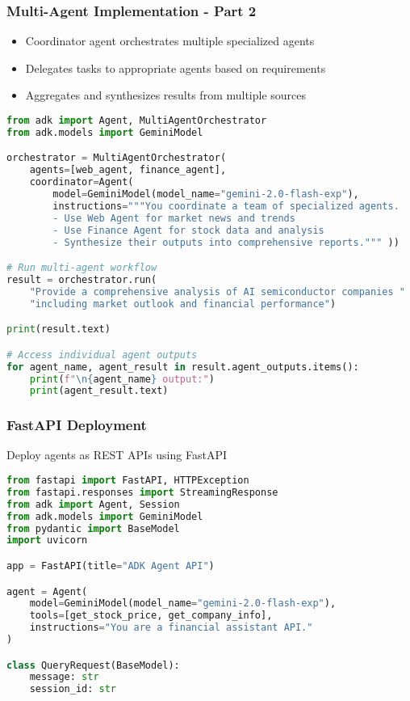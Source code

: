 \begin{frame}[fragile]\frametitle{Multi-Agent Implementation - Part 2}
      \begin{itemize}
	\item Coordinator agent orchestrates multiple specialized agents
	\item Delegates tasks to appropriate agents based on requirements
	\item Aggregates and synthesizes results from multiple sources
	  \end{itemize}
      
      \begin{lstlisting}[language=python, basicstyle=\tiny]
from adk import Agent, MultiAgentOrchestrator
from adk.models import GeminiModel

orchestrator = MultiAgentOrchestrator(
    agents=[web_agent, finance_agent],
    coordinator=Agent(
        model=GeminiModel(model_name="gemini-2.0-flash-exp"),
        instructions="""You coordinate a team of specialized agents.
        - Use Web Agent for market news and trends
        - Use Finance Agent for stock data and analysis
        - Synthesize their outputs into comprehensive reports.""" ))

# Run multi-agent workflow
result = orchestrator.run(
    "Provide a comprehensive analysis of AI semiconductor companies "
    "including market outlook and financial performance")

print(result.text)

# Access individual agent outputs
for agent_name, agent_result in result.agent_outputs.items():
    print(f"\n{agent_name} output:")
    print(agent_result.text)
      \end{lstlisting}
\end{frame}

\begin{frame}[fragile]\frametitle{FastAPI Deployment}
Deploy agents as REST APIs using FastAPI
      
      \begin{lstlisting}[language=python, basicstyle=\tiny]
from fastapi import FastAPI, HTTPException
from fastapi.responses import StreamingResponse
from adk import Agent, Session
from adk.models import GeminiModel
from pydantic import BaseModel
import uvicorn

app = FastAPI(title="ADK Agent API")

agent = Agent(
    model=GeminiModel(model_name="gemini-2.0-flash-exp"),
    tools=[get_stock_price, get_company_info],
    instructions="You are a financial assistant API."
)

class QueryRequest(BaseModel):
    message: str
    session_id: str

      \end{lstlisting}
\end{frame}

